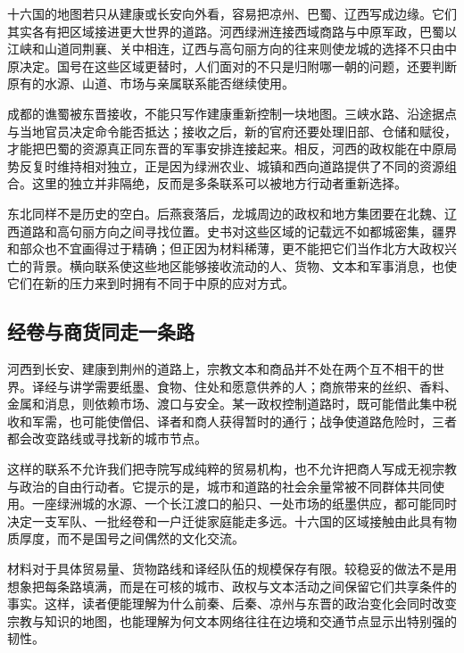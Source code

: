 十六国的地图若只从建康或长安向外看，容易把凉州、巴蜀、辽西写成边缘。它们其实各有把区域接进更大世界的道路。河西绿洲连接西域商路与中原军政，巴蜀以江峡和山道同荆襄、关中相连，辽西与高句丽方向的往来则使龙城的选择不只由中原决定。国号在这些区域更替时，人们面对的不只是归附哪一朝的问题，还要判断原有的水源、山道、市场与亲属联系能否继续使用。

成都的谯蜀被东晋接收，不能只写作建康重新控制一块地图。三峡水路、沿途据点与当地官员决定命令能否抵达；接收之后，新的官府还要处理旧部、仓储和赋役，才能把巴蜀的资源真正同东晋的军事安排连接起来。相反，河西的政权能在中原局势反复时维持相对独立，正是因为绿洲农业、城镇和西向道路提供了不同的资源组合。这里的独立并非隔绝，反而是多条联系可以被地方行动者重新选择。

东北同样不是历史的空白。后燕衰落后，龙城周边的政权和地方集团要在北魏、辽西道路和高句丽方向之间寻找位置。史书对这些区域的记载远不如都城密集，疆界和部众也不宜画得过于精确；但正因为材料稀薄，更不能把它们当作北方大政权兴亡的背景。横向联系使这些地区能够接收流动的人、货物、文本和军事消息，也使它们在新的压力来到时拥有不同于中原的应对方式。

\subsection{经卷与商货同走一条路}

河西到长安、建康到荆州的道路上，宗教文本和商品并不处在两个互不相干的世界。译经与讲学需要纸墨、食物、住处和愿意供养的人；商旅带来的丝织、香料、金属和消息，则依赖市场、渡口与安全。某一政权控制道路时，既可能借此集中税收和军需，也可能使僧侣、译者和商人获得暂时的通行；战争使道路危险时，三者都会改变路线或寻找新的城市节点。

这样的联系不允许我们把寺院写成纯粹的贸易机构，也不允许把商人写成无视宗教与政治的自由行动者。它提示的是，城市和道路的社会余量常被不同群体共同使用。一座绿洲城的水源、一个长江渡口的船只、一处市场的纸墨供应，都可能同时决定一支军队、一批经卷和一户迁徙家庭能走多远。十六国的区域接触由此具有物质厚度，而不是国号之间偶然的文化交流。

材料对于具体贸易量、货物路线和译经队伍的规模保存有限。较稳妥的做法不是用想象把每条路填满，而是在可核的城市、政权与文本活动之间保留它们共享条件的事实。这样，读者便能理解为什么前秦、后秦、凉州与东晋的政治变化会同时改变宗教与知识的地图，也能理解为何文本网络往往在边境和交通节点显示出特别强的韧性。
